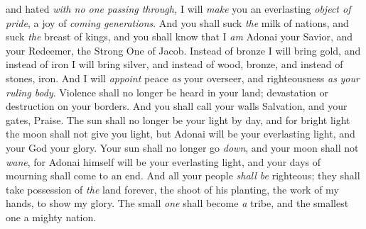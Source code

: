 \begin{biblechapter}
and hated \textit{with no one passing through,} 
I will \textit{make} you an everlasting \textit{object of pride}, 
a joy of \textit{coming generations}.
\verse And you shall suck \textit{the} milk of nations, 
and suck \textit{the} breast of kings, 
and you shall know that I \textit{am} Adonai your Savior, 
and your Redeemer, the Strong One of Jacob.
\verse Instead of bronze I will bring gold, 
and instead of iron I will bring silver, 
and instead of wood, bronze, 
and instead of stones, iron. 
And I will \textit{appoint} peace \textit{as} your overseer, 
and righteousness \textit{as} \textit{your ruling body}.
\verse Violence shall no longer be heard in your land; 
devastation or destruction on your borders. 
And you shall call your walls Salvation, 
and your gates, Praise.
\verse The sun shall no longer be your light by day, 
and for bright light the moon shall not give you light, 
but Adonai will be your everlasting light, 
and your God your glory.
\verse Your sun shall no longer go \textit{down}, 
and your moon shall not \textit{wane}, 
for Adonai himself will be your everlasting light, 
and your days of mourning shall come to an end.
\verse And all your people \textit{shall be} righteous; 
they shall take possession of \textit{the} land forever, 
the shoot of his planting, 
the work of my hands, to show my glory.
\verse The small \textit{one} shall become \textit{a} tribe, 
and the smallest one a mighty nation.
\end{biblechapter}

